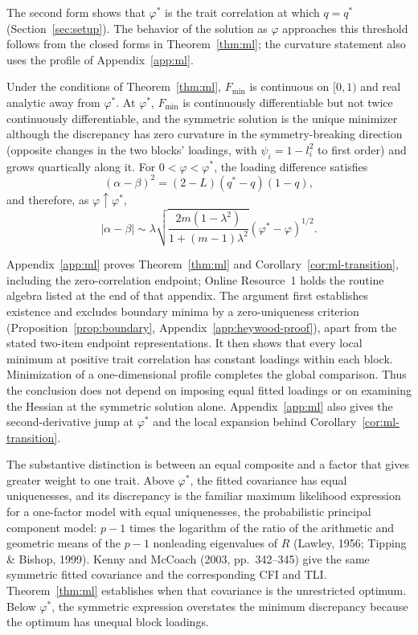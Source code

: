 The second form shows that $\varphi^*$ is the trait correlation at which $q=q^*$ (Section~\ref{sec:setup}). The behavior of the solution as $\varphi$ approaches this threshold follows from the closed forms in Theorem~\ref{thm:ml}; the curvature statement also uses the profile of Appendix~\ref{app:ml}.

\begin{corollary}
\label{cor:ml-transition}
Under the conditions of Theorem~\ref{thm:ml}, $F_{\min}$ is continuous on $[0,1)$ and real analytic away from $\varphi^*$. At $\varphi^*$, $F_{\min}$ is continuously differentiable but not twice continuously differentiable, and the symmetric solution is the unique minimizer although the discrepancy has zero curvature in the symmetry-breaking direction (opposite changes in the two blocks' loadings, with $\psi_i=1-l_i^2$ to first order) and grows quartically along it. For $0<\varphi<\varphi^*$, the loading difference satisfies
\begin{equation}
(\alpha-\beta)^2=(2-L)(q^*-q)(1-q),
\label{eq:loading-gap}
\end{equation}
and therefore, as $\varphi\uparrow\varphi^*$,
\[
|\alpha-\beta|\sim
\lambda\sqrt{\frac{2m(1-\lambda^2)}{1+(m-1)\lambda^2}}
(\varphi^*-\varphi)^{1/2}.
\]
\end{corollary}

Appendix~\ref{app:ml} proves Theorem~\ref{thm:ml} and Corollary~\ref{cor:ml-transition}, including the zero-correlation endpoint; Online Resource~1 holds the routine algebra listed at the end of that appendix. The argument first establishes existence and excludes boundary minima by a zero-uniqueness criterion (Proposition~\ref{prop:boundary}, Appendix~\ref{app:heywood-proof}), apart from the stated two-item endpoint representations. It then shows that every local minimum at positive trait correlation has constant loadings within each block. Minimization of a one-dimensional profile completes the global comparison. Thus the conclusion does not depend on imposing equal fitted loadings or on examining the Hessian at the symmetric solution alone. Appendix~\ref{app:ml} also gives the second-derivative jump at $\varphi^*$ and the local expansion behind Corollary~\ref{cor:ml-transition}.

The substantive distinction is between an equal composite and a factor that gives greater weight to one trait. Above $\varphi^*$, the fitted covariance has equal uniquenesses, and its discrepancy is the familiar maximum likelihood expression for a one-factor model with equal uniquenesses, the probabilistic principal component model: $p-1$ times the logarithm of the ratio of the arithmetic and geometric means of the $p-1$ nonleading eigenvalues of $R$ (Lawley, 1956; Tipping \& Bishop, 1999). Kenny and McCoach (2003, pp.~342--345) give the same symmetric fitted covariance and the corresponding CFI and TLI. Theorem~\ref{thm:ml} establishes when that covariance is the unrestricted optimum. Below $\varphi^*$, the symmetric expression overstates the minimum discrepancy because the optimum has unequal block loadings.

